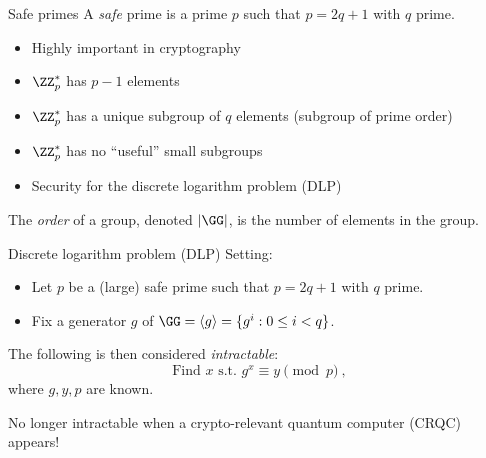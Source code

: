 \begin{frame}{Safe primes}
  A \emph{safe} prime is a prime $p$ such that $p = 2q + 1$ with $q$ prime.
  \begin{itemize}[<+(1)->]
    \item Highly important in cryptography
    \item $\ZZ_p^*$ has $p-1$ elements
    \item $\ZZ_p^*$ has a unique subgroup of $q$ elements (subgroup of prime order)
    \item $\ZZ_p^*$ has no \enquote{useful} small subgroups
    \item Security for the discrete logarithm problem (DLP)
  \end{itemize}

  \vspace*{1em}
  \pause
  The \emph{order} of a group, denoted $\lvert\GG\rvert$, is the number of elements in the group.
\end{frame}

\begin{frame}{Discrete logarithm problem (DLP)}
  Setting:
  \begin{itemize}[<+(1)->]
    \item Let $p$ be a (large) safe prime such that $p = 2q + 1$ with $q$ prime.
    \item Fix a generator $g$ of $\GG = \langle g \rangle = \{g^i :0 \le i < q\}$.
  \end{itemize}

  \vspace*{1em}

  \pause
  The following is then considered \emph{intractable}:
  \[
    \text{Find $x$ s.t. } g^x \equiv y \pmod{p}\ ,
  \]
  where $g, y, p$ are known.

  \pause
  No longer intractable when a crypto-relevant quantum computer (CRQC) appears!
\end{frame}

